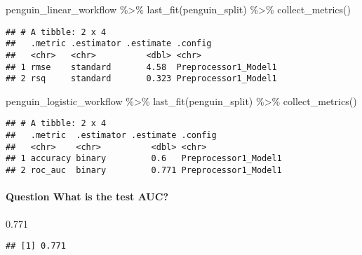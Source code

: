 \documentclass[
]{article}
\newenvironment{Shaded}{\begin{snugshade}}{\end{snugshade}}
\newcommand{\FloatTok}[1]{\textcolor[rgb]{0.00,0.00,0.81}{#1}}
\newcommand{\FunctionTok}[1]{\textcolor[rgb]{0.00,0.00,0.00}{#1}}
\newcommand{\NormalTok}[1]{#1}
\newcommand{\SpecialCharTok}[1]{\textcolor[rgb]{0.00,0.00,0.00}{#1}}
\begin{document}
\begin{Shaded}
\begin{Highlighting}[]
\NormalTok{penguin\_linear\_workflow }\SpecialCharTok{\%\textgreater{}\%} 
  \FunctionTok{last\_fit}\NormalTok{(penguin\_split) }\SpecialCharTok{\%\textgreater{}\%} 
  \FunctionTok{collect\_metrics}\NormalTok{()}
\end{Highlighting}
\end{Shaded}

\begin{verbatim}
## # A tibble: 2 x 4
##   .metric .estimator .estimate .config             
##   <chr>   <chr>          <dbl> <chr>               
## 1 rmse    standard       4.58  Preprocessor1_Model1
## 2 rsq     standard       0.323 Preprocessor1_Model1
\end{verbatim}

\begin{Shaded}
\begin{Highlighting}[]
\NormalTok{penguin\_logistic\_workflow }\SpecialCharTok{\%\textgreater{}\%}
  \FunctionTok{last\_fit}\NormalTok{(penguin\_split) }\SpecialCharTok{\%\textgreater{}\%}
  \FunctionTok{collect\_metrics}\NormalTok{()}
\end{Highlighting}
\end{Shaded}

\begin{verbatim}
## # A tibble: 2 x 4
##   .metric  .estimator .estimate .config             
##   <chr>    <chr>          <dbl> <chr>               
## 1 accuracy binary         0.6   Preprocessor1_Model1
## 2 roc_auc  binary         0.771 Preprocessor1_Model1
\end{verbatim}

\hypertarget{question-what-is-the-test-auc}{%
\paragraph{Question What is the test
AUC?}\label{question-what-is-the-test-auc}}

\begin{Shaded}
\begin{Highlighting}[]
\FloatTok{0.771}
\end{Highlighting}
\end{Shaded}

\begin{verbatim}
## [1] 0.771
\end{verbatim}
\end{document}

